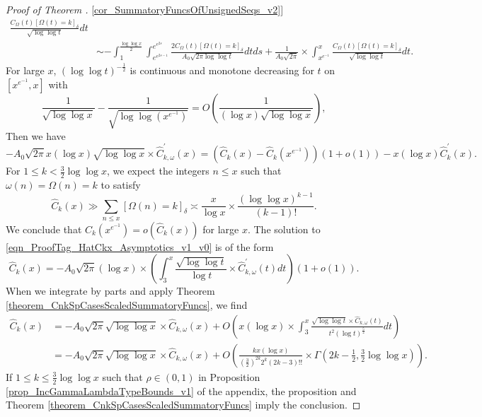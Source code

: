 \documentclass[11pt,reqno,a4letter]{article}
\newcommand{\hlocalref}[1]{\hyperref[#1]{\ref{#1}}}
\numberwithin{equation}{section}
\numberwithin{figure}{section}
\numberwithin{table}{section}
\newcommand{\Iverson}[1]{\ensuremath{\left[#1\right]_{\delta}}}
\theoremstyle{plain}
\numberwithin{theorem}{section}
\theoremstyle{definition}
\begin{document}
\begin{proof}[Proof of Theorem \hlocalref{cor_SummatoryFuncsOfUnsignedSeqs_v2}]
\begin{align*}
     \frac{C_{\Omega}(t) \Iverson{\Omega(t) = k}}{\sqrt{\log\log t}} dt \\ 
     & \sim -\int_1^{\frac{\log\log x}{2}} \int_{e^{e^{2s-1}}}^{e^{e^{2s}}} 
     \frac{2 C_{\Omega}(t) \Iverson{\Omega(t) = k}}{A_0 \sqrt{2\pi \log\log t}} dt ds +
     \frac{1}{A_0 \sqrt{2\pi}} \times \int_{x^{e^{-1}}}^x 
     \frac{C_{\Omega}(t) \Iverson{\Omega(t) = k}}{\sqrt{\log\log t}} dt. 
\end{align*} 
For large $x$, $(\log\log t)^{-\frac{1}{2}}$ is continuous and monotone decreasing for $t$ on 
$\left[x^{e^{-1}}, x\right]$ with 
\[
\frac{1}{\sqrt{\log\log x}} - \frac{1}{\sqrt{\log\log\left(x^{e^{-1}}\right)}} = 
     O\left(\frac{1}{(\log x) \sqrt{\log\log x}}\right), 
\]
Then we have 
\begin{equation} 
\label{eqn_ProofTag_HatCkx_Asymptotics_v1_v0}
     -A_0 \sqrt{2\pi} x (\log x) \sqrt{\log\log x} \times \widehat{C}_{k,\omega}^{\prime}(x) = 
     \left(\widehat{C}_k(x) - \widehat{C}_k\left(x^{e^{-1}}\right)\right)(1+o(1)) - 
     x (\log x) \widehat{C}_k^{\prime}(x). 
\end{equation} 
For $1 \leq k < \frac{3}{2} \log\log x$, we expect the integers $n \leq x$ 
such that $\omega(n) = \Omega(n) = k$ to satisfy 
\[
\widehat{C}_k(x) \gg \sum_{n \leq x} \Iverson{\Omega(n) = k} \asymp 
     \frac{x}{\log x} \times \frac{(\log\log x)^{k-1}}{(k-1)!}. 
\]
We conclude that 
$\widehat{C}_k\left(x^{e^{-1}}\right) = o\left(\widehat{C}_k(x)\right)$ for large $x$. 
The solution to \eqref{eqn_ProofTag_HatCkx_Asymptotics_v1_v0} is of the form 
\[
\widehat{C}_k(x) = -A_0\sqrt{2\pi}(\log x) \times \left(\int_3^x 
     \frac{\sqrt{\log\log t}}{\log t} \times \widehat{C}_{k,\omega}^{\prime}(t) dt\right)(1+o(1)). 
\]
When we integrate by parts and apply 
Theorem \hlocalref{theorem_CnkSpCasesScaledSummatoryFuncs}, we find 
\begin{align*}
\widehat{C}_k(x) & = -A_0 \sqrt{2\pi} \sqrt{\log\log x} \times \widehat{C}_{k,\omega}(x) + 
     O\left(x (\log x) \times \int_3^x \frac{\sqrt{\log\log t} \times 
     \widehat{C}_{k,\omega}(t)}{t^2 (\log t)^{\frac{5}{2}}} dt\right) \\ 
     & = -A_0 \sqrt{2\pi} \sqrt{\log\log x} \times \widehat{C}_{k,\omega}(x) + 
     O\left(\frac{kx (\log x)}{\left(\frac{3}{2}\right)^{2k} 2^k (2k-3)!!} \times 
     \Gamma\left(2k-\frac{1}{2}, \frac{3}{2}\log\log x\right)\right). 
\end{align*} 
If $1 \leq k \leq \frac{3}{2} \log\log x$ such that $\rho \in (0, 1)$ in 
Proposition \hlocalref{prop_IncGammaLambdaTypeBounds_v1} of the appendix, the proposition and 
Theorem \hlocalref{theorem_CnkSpCasesScaledSummatoryFuncs} 
imply the conclusion. 
\end{proof}
\end{document}
